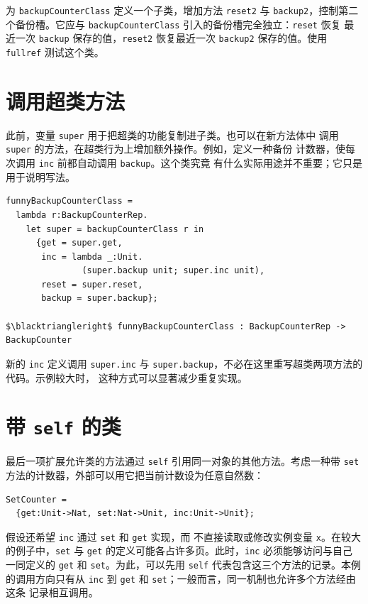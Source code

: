 \begin{exercise}
\label{ex:18.7.1}
为 \texttt{backupCounterClass} 定义一个子类，增加方法
\texttt{reset2} 与 \texttt{backup2}，控制第二个备份槽。它应与
\texttt{backupCounterClass} 引入的备份槽完全独立：\texttt{reset} 恢复
最近一次 \texttt{backup} 保存的值，\texttt{reset2} 恢复最近一次
\texttt{backup2} 保存的值。使用 \texttt{fullref} 测试这个类。
\end{exercise}

\section{调用超类方法}
\label{sec:18.8}

此前，变量 \texttt{super} 用于把超类的功能复制进子类。也可以在新方法体中
调用 \texttt{super} 的方法，在超类行为上增加额外操作。例如，定义一种备份
计数器，使每次调用 \texttt{inc} 前都自动调用 \texttt{backup}。这个类究竟
有什么实际用途并不重要；它只是用于说明写法。

\begin{lstlisting}[mathescape=true]
funnyBackupCounterClass =
  lambda r:BackupCounterRep.
    let super = backupCounterClass r in
      {get = super.get,
       inc = lambda _:Unit.
               (super.backup unit; super.inc unit),
       reset = super.reset,
       backup = super.backup};

$\blacktriangleright$ funnyBackupCounterClass : BackupCounterRep -> BackupCounter
\end{lstlisting}

新的 \texttt{inc} 定义调用 \texttt{super.inc} 与
\texttt{super.backup}，不必在这里重写超类两项方法的代码。示例较大时，
这种方式可以显著减少重复实现。

\section{带 \texttt{self} 的类}
\label{sec:18.9}

最后一项扩展允许类的方法通过 \texttt{self} 引用同一对象的其他方法。考虑一种带
\texttt{set} 方法的计数器，外部可以用它把当前计数设为任意自然数：

\begin{lstlisting}[mathescape=true]
SetCounter =
  {get:Unit->Nat, set:Nat->Unit, inc:Unit->Unit};
\end{lstlisting}

假设还希望 \texttt{inc} 通过 \texttt{set} 和 \texttt{get} 实现，而
不直接读取或修改实例变量 \texttt{x}。在较大的例子中，\texttt{set} 与
\texttt{get} 的定义可能各占许多页。此时，\texttt{inc} 必须能够访问与自己
一同定义的 \texttt{get} 和 \texttt{set}。为此，可以先用 \texttt{self}
代表包含这三个方法的记录。本例的调用方向只有从 \texttt{inc} 到
\texttt{get} 和 \texttt{set}；一般而言，同一机制也允许多个方法经由这条
记录相互调用。

